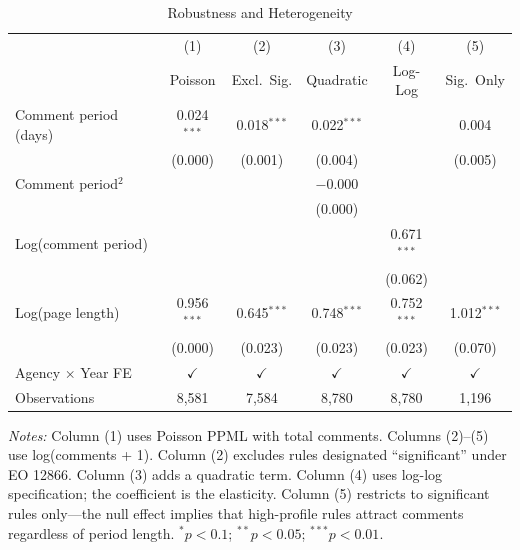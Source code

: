 \begin{table}[t]
\centering
\caption{Robustness and Heterogeneity}
\label{tab:robustness}
\begin{threeparttable}
\begin{tabular}{lccccc}
\toprule
 & (1) & (2) & (3) & (4) & (5) \\
 & Poisson & Excl.\ Sig. & Quadratic & Log-Log & Sig.\ Only \\
\midrule
Comment period (days) & 0.024$^{***}$ & 0.018$^{***}$ & 0.022$^{***}$ & & 0.004 \\
 & (0.000) & (0.001) & (0.004) & & (0.005) \\[3pt]
Comment period$^2$ & & & $-$0.000 & & \\
 & & & (0.000) & & \\[3pt]
Log(comment period) & & & & 0.671$^{***}$ & \\
 & & & & (0.062) & \\[3pt]
Log(page length) & 0.956$^{***}$ & 0.645$^{***}$ & 0.748$^{***}$ & 0.752$^{***}$ & 1.012$^{***}$ \\
 & (0.000) & (0.023) & (0.023) & (0.023) & (0.070) \\[6pt]
Agency $\times$ Year FE & $\checkmark$ & $\checkmark$ & $\checkmark$ & $\checkmark$ & $\checkmark$ \\
Observations & 8,581 & 7,584 & 8,780 & 8,780 & 1,196 \\
\bottomrule
\end{tabular}
\begin{tablenotes}
\small
\item \textit{Notes:} Column (1) uses Poisson PPML with total comments. Columns (2)--(5) use log(comments + 1). Column (2) excludes rules designated ``significant'' under EO 12866. Column (3) adds a quadratic term. Column (4) uses log-log specification; the coefficient is the elasticity. Column (5) restricts to significant rules only---the null effect implies that high-profile rules attract comments regardless of period length. $^{*}p<0.1$; $^{**}p<0.05$; $^{***}p<0.01$.
\end{tablenotes}
\end{threeparttable}
\end{table}
